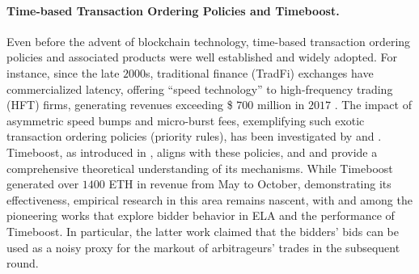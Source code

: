 \documentclass[runningheads]{llncs}
\begin{document}
\paragraph*{Time-based Transaction Ordering Policies and Timeboost.}
Even before the advent of blockchain technology, time-based transaction ordering policies and associated products were well established and widely adopted. For instance, since the late $2000$s, traditional finance (TradFi) exchanges have commercialized latency, offering ``speed technology'' to high-frequency trading (HFT) firms, generating revenues exceeding \$ $700$ million in $2017$ \cite{budish2024theory}. The impact of asymmetric speed bumps and micro-burst fees, exemplifying such exotic transaction ordering policies (priority rules), has been investigated by \cite{Aoyagi_2025} and \cite{brolley2023liquid}. Timeboost, as introduced in \cite{mamageishvili2023buying}, aligns with these policies, and \cite{akaki2025blind} and \cite{fritsch2024mev} provide a comprehensive theoretical understanding of its mechanisms. While Timeboost generated over $1400$ ETH in revenue from May to October, demonstrating its effectiveness, empirical research in this area remains nascent, with \cite{messias2025express} and \cite{mamageishvili2025timeboostaheadoftimeauctionswork} among the pioneering works that explore bidder behavior in ELA and the performance of Timeboost. In particular, the latter work claimed that the bidders' bids can be used as a noisy proxy for the markout of arbitrageurs' trades in the subsequent round.

\end{document}
